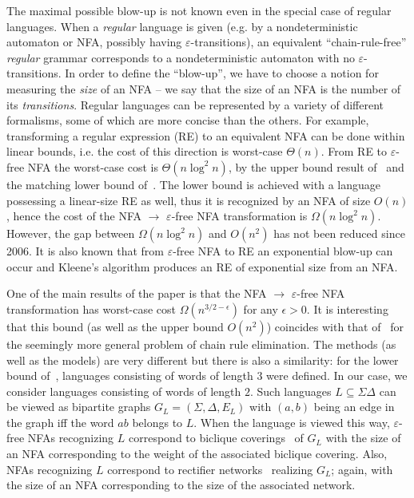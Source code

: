 \documentclass[submission]{llncs}
\begin{document}
  The maximal possible blow-up is not known even in the special case of regular languages.
  When a \emph{regular} language is given (e.g. by a
  nondeterministic automaton or NFA, possibly having $\varepsilon$-transitions), an equivalent ``chain-rule-free'' \emph{regular} grammar
  corresponds to a nondeterministic automaton with no $\varepsilon$-transitions. In order to define the ``blow-up'', we
  have to choose a notion for measuring the \emph{size} of an NFA -- we say that the size of an NFA is the number of its \emph{transitions}.
  Regular languages can be represented by a variety of different formalisms, some of which are more concise than the others.
  For example, transforming a regular expression (RE) to an equivalent NFA can be done within linear bounds, i.e. the cost of
  this direction is worst-case $\Theta(n)$. From RE to $\varepsilon$-free NFA the worst-case cost is $\Theta(n\log^2 n)$,
  by the upper bound result of~\cite{Hromkovic:1997:TRE:646512.695338} and the matching lower bound of~\cite{Schnitger06regularexpressions}.
  The lower bound is achieved with a language possessing a linear-size RE as well, thus it is recognized by an NFA of size $O(n)$,
  hence the cost of the NFA $\to$ $\varepsilon$-free NFA transformation is $\Omega(n\log^2 n)$.
  However, the gap between $\Omega(n\log^2 n)$ and $O(n^2)$ has not been reduced since 2006.
  It is also known that from $\varepsilon$-free NFA to RE an exponential blow-up can occur and Kleene's algorithm produces an
  RE of exponential size from an NFA.

  One of the main results of the paper is that the NFA $\to$ $\varepsilon$-free NFA transformation has worst-case cost $\Omega(n^{3/2-\epsilon})$
  for any $\epsilon>0$. It is interesting that this bound (as well as the upper bound $O(n^2)$)
  coincides with that of~\cite{Blum1983287} for the seemingly more general problem of chain rule elimination.
  The methods (as well as the models) are very different but there is also a similarity: for the lower bound of~\cite{Blum1983287},
  languages consisting of words of length $3$ were defined. In our case, we consider languages consisting of words of length $2$.
  Such languages $L\subseteq\Sigma\Delta$ can be viewed as bipartite graphs $G_L=(\Sigma,\Delta,E_L)$ with $(a,b)$ being an edge in the graph
  iff the word $ab$ belongs to $L$. When the language is viewed this way, $\varepsilon$-free NFAs recognizing $L$
  correspond to biclique coverings~\cite{JuknaChapter2013} of $G_L$
  with the size of an NFA corresponding to the weight of the associated biclique covering.
  Also, NFAs recognizing $L$ correspond to rectifier networks~\cite{JuknaChapter2013} realizing $G_L$;
  again, with the size of an NFA corresponding to the size of the associated network.
\end{document}
